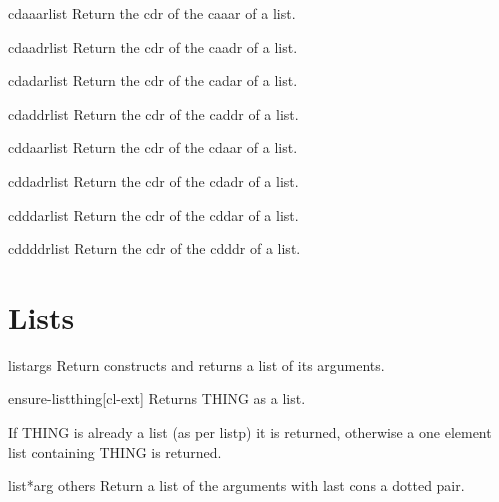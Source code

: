 \documentclass[10pt,english]{book}
\begin{document}
\begin{accessor}{cdaaar}{list}
  Return the cdr of the caaar of a list.
\end{accessor}

\begin{accessor}{cdaadr}{list}
  Return the cdr of the caadr of a list.
\end{accessor}

\begin{accessor}{cdadar}{list}
  Return the cdr of the cadar of a list.
\end{accessor}

\begin{accessor}{cdaddr}{list}
  Return the cdr of the caddr of a list.
\end{accessor}

\begin{accessor}{cddaar}{list}
  Return the cdr of the cdaar of a list.
\end{accessor}

\begin{accessor}{cddadr}{list}
  Return the cdr of the cdadr of a list.
\end{accessor}

\begin{accessor}{cdddar}{list}
  Return the cdr of the cddar of a list.
\end{accessor}

\begin{accessor}{cddddr}{list}
  Return the cdr of the cdddr of a list.
\end{accessor}

\section{Lists}
\label{sec:lists}

\begin{function}{list}{\rest args}
  Return constructs and returns a list of its arguments.
\end{function}

\begin{function}{ensure-list}{thing}[cl-ext]
  Returns THING as a list.

If THING is already a list (as per listp) it is returned,
otherwise a one element list containing THING is returned.
\end{function}

\begin{function}{list*}{arg \rest others}
  Return a list of the arguments with last cons a dotted pair.
\end{function}
\end{document}
